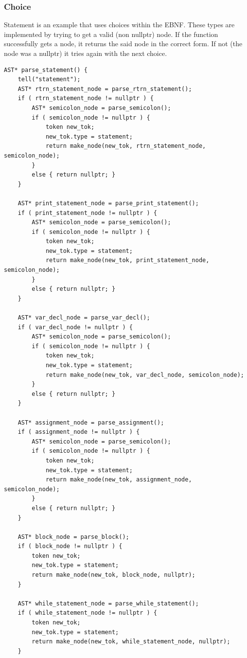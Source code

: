 \documentclass[a4paper, 12pt]{article}
\begin{document}
\subsubsection{Choice}
Statement is an example that uses choices within the EBNF. These types are implemented by trying to get 
a valid (non nullptr) node. If the function successfully gets a node, it returns the said node in the correct form. If
not (the node was a nullptr) it tries again with the next choice.

\begin{lstlisting}[caption="Choice example"]
AST* parse_statement() {
    tell("statement");
    AST* rtrn_statement_node = parse_rtrn_statement();
    if ( rtrn_statement_node != nullptr ) {
        AST* semicolon_node = parse_semicolon();
        if ( semicolon_node != nullptr ) {
            token new_tok;
            new_tok.type = statement;
            return make_node(new_tok, rtrn_statement_node, semicolon_node);
        }
        else { return nullptr; }
    }

    AST* print_statement_node = parse_print_statement();
    if ( print_statement_node != nullptr ) {
        AST* semicolon_node = parse_semicolon();
        if ( semicolon_node != nullptr ) {
            token new_tok;
            new_tok.type = statement;
            return make_node(new_tok, print_statement_node, semicolon_node);
        }
        else { return nullptr; }
    }

    AST* var_decl_node = parse_var_decl();
    if ( var_decl_node != nullptr ) {
        AST* semicolon_node = parse_semicolon();
        if ( semicolon_node != nullptr ) {
            token new_tok;
            new_tok.type = statement;
            return make_node(new_tok, var_decl_node, semicolon_node);
        }
        else { return nullptr; }
    }

    AST* assignment_node = parse_assignment();
    if ( assignment_node != nullptr ) {
        AST* semicolon_node = parse_semicolon();
        if ( semicolon_node != nullptr ) {
            token new_tok;
            new_tok.type = statement;
            return make_node(new_tok, assignment_node, semicolon_node);
        }
        else { return nullptr; }
    }

    AST* block_node = parse_block();
    if ( block_node != nullptr ) {
        token new_tok;
        new_tok.type = statement;
        return make_node(new_tok, block_node, nullptr);
    }

    AST* while_statement_node = parse_while_statement();
    if ( while_statement_node != nullptr ) {
        token new_tok;
        new_tok.type = statement;
        return make_node(new_tok, while_statement_node, nullptr);
    }


\end{lstlisting}
\end{document}
